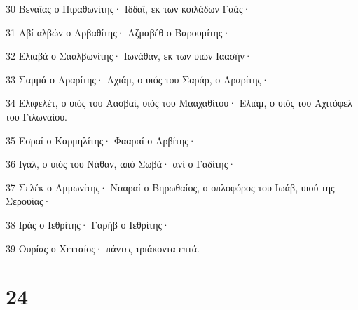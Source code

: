\par 30 Βεναΐας ο Πιραθωνίτης· Ιδδαΐ, εκ των κοιλάδων Γαάς·
\par 31 Αβί-αλβών ο Αρβαθίτης· Αζμαβέθ ο Βαρουμίτης·
\par 32 Ελιαβά ο Σααλβωνίτης· Ιωνάθαν, εκ των υιών Ιαασήν·
\par 33 Σαμμά ο Αραρίτης· Αχιάμ, ο υιός του Σαράρ, ο Αραρίτης·
\par 34 Ελιφελέτ, ο υιός του Αασβαί, υιός του Μααχαθίτου· Ελιάμ, ο υιός του Αχιτόφελ του Γιλωναίου.
\par 35 Εσραΐ ο Καρμηλίτης· Φααραί ο Αρβίτης·
\par 36 Ιγάλ, ο υιός του Νάθαν, από Σωβά· ανί ο Γαδίτης·
\par 37 Σελέκ ο Αμμωνίτης· Νααραί ο Βηρωθαίος, ο οπλοφόρος του Ιωάβ, υιού της Σερουΐας·
\par 38 Ιράς ο Ιεθρίτης· Γαρήβ ο Ιεθρίτης·
\par 39 Ουρίας ο Χετταίος· πάντες τριάκοντα επτά.

\chapter{24}

